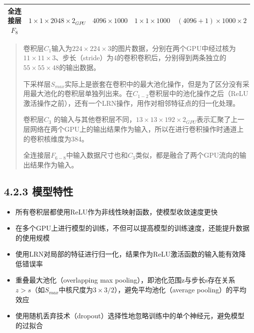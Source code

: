 \begin{longtable}[]{ ccccc }
\begin{minipage}[t]{0.11\columnwidth}
全连接层\(F_8\)\strut
\end{minipage} & \begin{minipage}[t]{0.18\columnwidth}\centering\strut
\(1\times1\times2048\times2_{GPU}\)\strut
\end{minipage} & \begin{minipage}[t]{0.20\columnwidth}\centering\strut
\(4096\times1000\)\strut
\end{minipage} & \begin{minipage}[t]{0.18\columnwidth}\centering\strut
\(1\times1\times1000\)\strut
\end{minipage} & \begin{minipage}[t]{0.19\columnwidth}\centering\strut
\((4096+1)\times1000\times2\)\strut
\end{minipage}\tabularnewline
\bottomrule
\end{longtable}

\begin{quote}
卷积层\(C_1\)输入为\(224\times224\times3\)的图片数据，分别在两个GPU中经过核为\(11\times11\times3\)、步长（stride）为4的卷积卷积后，分别得到两条独立的\(55\times55\times48\)的输出数据。

下采样层\(S_{max}\)实际上是嵌套在卷积中的最大池化操作，但是为了区分没有采用最大池化的卷积层单独列出来。在\(C_{1-2}\)卷积层中的池化操作之后（ReLU激活操作之前），还有一个LRN操作，用作对相邻特征点的归一化处理。

卷积层\(C_3\)
的输入与其他卷积层不同，\(13\times13\times192\times2_{GPU}\)表示汇聚了上一层网络在两个GPU上的输出结果作为输入，所以在进行卷积操作时通道上的卷积核维度为384。

全连接层\(F_{6-8}\)中输入数据尺寸也和\(C_3\)类似，都是融合了两个GPU流向的输出结果作为输入。
\end{quote}

\subsection{4.2.3 模型特性}\label{ux6a21ux578bux7279ux6027-1}

\begin{itemize}
\item
  所有卷积层都使用ReLU作为非线性映射函数，使模型收敛速度更快
\item
  在多个GPU上进行模型的训练，不但可以提高模型的训练速度，还能提升数据的使用规模
\item
  使用LRN对局部的特征进行归一化，结果作为ReLU激活函数的输入能有效降低错误率
\item
  重叠最大池化（overlapping max
  pooling），即池化范围z与步长s存在关系\(z>s\)（如\(S_{max}\)中核尺度为\(3\times3/2\)），避免平均池化（average
  pooling）的平均效应
\item
  使用随机丢弃技术（dropout）选择性地忽略训练中的单个神经元，避免模型的过拟合
\end{itemize}

